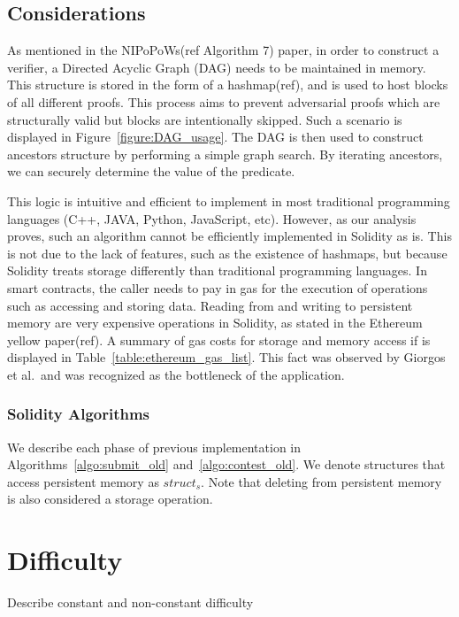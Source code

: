 \subsection{Considerations}

As mentioned in the NIPoPoWs(ref Algorithm 7) paper, in order to construct a
verifier, a Directed Acyclic Graph (DAG) needs to be maintained in memory. This
structure is stored in the form of a hashmap(ref), and is used to host blocks
of all different proofs. This process aims to prevent adversarial proofs which
are structurally valid but blocks are intentionally skipped. Such a scenario is
displayed in Figure~\ref{figure:DAG_usage}. The DAG is then used to construct
ancestors structure by performing a simple graph search. By iterating
ancestors, we can securely determine the value of the predicate.



This logic is intuitive and efficient to implement in most traditional
programming languages (C++, JAVA, Python, JavaScript, etc). However, as our
analysis proves, such an algorithm cannot be efficiently implemented in
Solidity as is. This is not due to the lack of features, such as the existence
of hashmaps, but because Solidity treats storage differently than traditional
programming languages. In smart contracts, the caller needs to pay in gas for
the execution of operations such as accessing and storing data. Reading from
and writing to persistent memory are very expensive operations in Solidity, as
stated in the Ethereum yellow paper(ref). A summary of gas costs for storage
and memory access if is displayed in Table~\ref{table:ethereum_gas_list}. This
fact was observed by Giorgos et al.\ and was recognized as the bottleneck of
the application.



\subsubsection{Solidity Algorithms}

We describe each phase of previous implementation in
Algorithms~\ref{algo:submit_old} and~\ref{algo:contest_old}. We denote
structures that access persistent memory as $struct_{s}$. Note that deleting
from persistent memory is also considered a storage operation.

% 


\section{Difficulty}

Describe constant and non-constant difficulty
